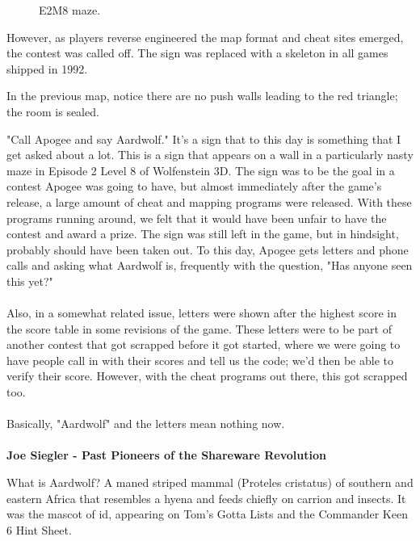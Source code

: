 \begin{figure}[H]
  \centering
 \caption{E2M8 maze.}
\end{figure}
\par
\begin{figure}
\vspace{-10pt}
\end{figure}
However, as players reverse engineered the map format and cheat sites emerged, the contest was called off. The sign was replaced with a skeleton in all games shipped in 1992.\\
\par
In the previous map, notice there are no push walls leading to the red triangle; the room is sealed.\\
\begin{fancyquotes}
"Call Apogee and say Aardwolf."  It's a sign that to this day is something
that I get asked about a lot.  This is a sign that appears on a wall in a
particularly nasty maze in Episode 2 Level 8 of Wolfenstein 3D.  The sign
was to be the goal in a contest Apogee was going to have, but almost
immediately after the game's release, a large amount of cheat and mapping
programs were released.  With these programs running around, we felt that
it would have been unfair to have the contest and award a prize.  The sign
was still left in the game, but in hindsight, probably should have been
taken out.  To this day, Apogee gets letters and phone calls and asking
what Aardwolf is, frequently with the question, "Has anyone seen this yet?"\\
\\
Also, in a somewhat related issue, letters were shown after the highest score
in the score table in some revisions of the game.  These letters were to be
part of another contest that got scrapped before it got started, where we were
going to have people call in with their scores and tell us the code; we'd then
be able to verify their score.  However, with the cheat programs out there,
this got scrapped too.\\
\\
Basically, "Aardwolf" and the letters mean nothing now.\\
\\
\textbf{Joe Siegler - Past Pioneers of the Shareware Revolution}
\end{fancyquotes}
\par
\bigskip
{} What is Aardwolf? A maned striped mammal (Proteles cristatus) of southern and eastern Africa that resembles a hyena and feeds chiefly on carrion and insects. It was the mascot of id, appearing on Tom's Gotta Lists and the Commander Keen 6 Hint Sheet.\\
\par

